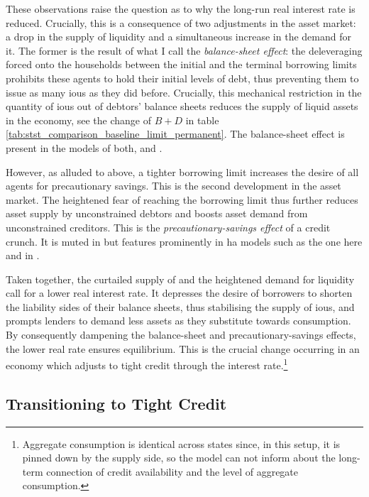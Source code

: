 \documentclass[a4paper,12pt]{article} %
\numberwithin{equation}{section} %
\numberwithin{figure}{section}
\numberwithin{table}{section}
\begin{document}
These observations raise the question as to why the long-run real interest rate is reduced. Crucially, this is a consequence of two adjustments in the asset market: a drop in the supply of liquidity and a simultaneous increase in the demand for it. The former is the result of what I call the \textit{balance-sheet effect}: the deleveraging forced onto the households between the initial and the terminal borrowing limits prohibits these agents to hold their initial levels of debt, thus preventing them to issue as many \Gls{iou}s as they did before. Crucially, this mechanical restriction in the quantity of \Gls{iou}s out of debtors' balance sheets reduces the supply of liquid assets in the economy, see the change of $B + D$ in table \ref{tab:stst_comparison_baseline_limit_permanent}. The balance-sheet effect is present in the models of both, \textcite{egg2012} and \textcite{gl2017}. 

However, as alluded to above, a tighter borrowing limit increases the desire of all agents for precautionary savings. This is the second development in the asset market. The heightened fear of reaching the borrowing limit thus further reduces asset supply by unconstrained debtors and boosts asset demand from unconstrained creditors. This is the \textit{precautionary-savings effect} of a credit crunch. It is muted in \textcite{egg2012} but features prominently in \Gls{ha} models such as the one here and in \textcite{gl2017}. 

Taken together, the curtailed supply of and the heightened demand for liquidity call for a lower real interest rate. It depresses the desire of borrowers to shorten the liability sides of their balance sheets, thus stabilising the supply of \Gls{iou}s, and prompts lenders to demand less assets as they substitute towards consumption. By consequently dampening the balance-sheet and precautionary-savings effects, the lower real rate ensures equilibrium. This is the crucial change occurring in an economy which adjusts to tight credit through the interest rate.\footnote{Aggregate consumption is identical across states since, in this setup, it is pinned down by the supply side, so the model can not inform about the long-term connection of credit availability and the level of aggregate consumption.}

\subsection{Transitioning to Tight Credit}
\label{sec:limit-transition}
\end{document}
